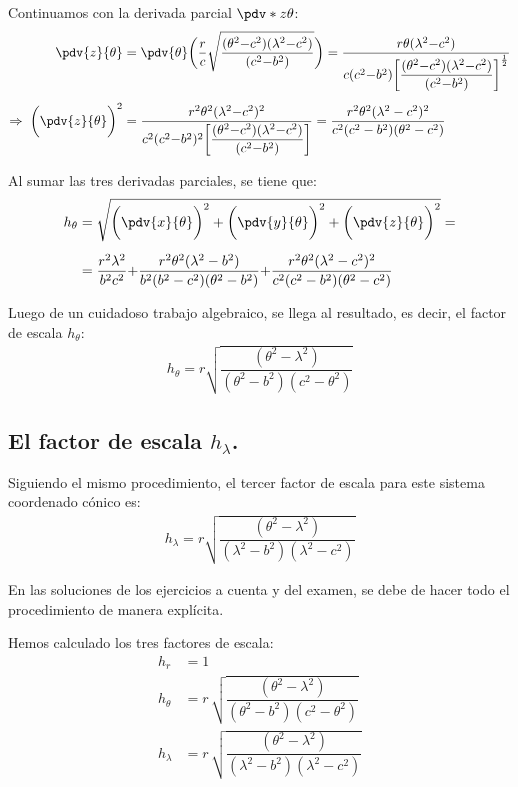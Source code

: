 Continuamos con la derivada parcial $\pdv*{z}{\theta}$:
\begin{align*}
\pdv{z}{\theta} &=  \pdv{\theta} \bigg( \dfrac{r}{c} \sqrt{\dfrac{(\theta^{2} {-} c^{2})(\lambda^{2} {-} c^{2})}{(c^{2} {-} b^{2})}} \bigg) = \dfrac{r \theta (\lambda^{2} {-} c^{2})}{c (c^{2} {-} b^{2}) \bigg[ \dfrac{(\theta^{2} {-} c^{2})(\lambda^{2} {-} c^{2})}{(c^{2} {-} b^{2})} \bigg]^{\frac{1}{2}}} \\[0.5em]
\Rightarrow \hspace{0.1cm} \bigg( \pdv{z}{\theta} \bigg)^{2} &= \dfrac{r^{2} \theta^{2} (\lambda^{2} {-} c^{2})^{2}}{c^{2} (c^{2} {-} b^{2})^{2} \bigg[ \dfrac{(\theta^{2} {-} c^{2})(\lambda^{2} {-} c^{2})}{(c^{2} {-} b^{2})} \bigg]} = \dfrac{r^{2} \theta^{2} (\lambda^{2} - c^{2})^{2}}{c^{2} (c^{2} - b^{2}) (\theta^{2} - c^{2})}
\end{align*}

Al sumar las tres derivadas parciales, se tiene que:
\begin{align*}
h_{\theta} &= \sqrt{\bigg( \pdv{x}{\theta} \bigg)^{2} + \bigg( \pdv{y}{\theta} \bigg)^{2} + \bigg( \pdv{z}{\theta} \bigg)^{2}} = \\[0.5em] 
&= \dfrac{r^{2} \lambda^{2}}{b^{2} c^{2}} {+} \dfrac{r^{2} \theta^{2} (\lambda^{2} - b^{2})}{b^{2} (b^{2} - c^{2}) (\theta^{2} - b^{2})} {+} \dfrac{r^{2} \theta^{2} (\lambda^{2} - c^{2})^{2}}{c^{2} (c^{2} - b^{2}) (\theta^{2} - c^{2})}
\end{align*}

Luego de un cuidadoso trabajo algebraico, se llega al resultado, es decir, el factor de escala $h_{\theta}$:
\begin{align*}
h_{\theta} = r \sqrt{\dfrac{(\theta^{2} - \lambda^{2})}{(\theta^{2} - b^{2})(c^{2} - \theta^{2})}}
\end{align*}

\subsection*{El factor de escala \texorpdfstring{$h_{\lambda}$}{hl}.}

Siguiendo el mismo procedimiento, el tercer factor de escala para este sistema coordenado cónico es:
\begin{align*}
h_{\lambda} = r \sqrt{\dfrac{(\theta^{2} - \lambda^{2})}{(\lambda^{2} - b^{2})(\lambda^{2} - c^{2})}}
\end{align*}

En las soluciones de los ejercicios a cuenta y del examen, se debe de hacer todo el procedimiento de manera explícita.
\par
Hemos calculado los tres factores de escala:
\begin{align*}
h_{r} &= 1 \\[0.5em]
h_{\theta} &=  r \, \sqrt{\dfrac{(\theta^{2} - \lambda^{2})}{(\theta^{2} - b^{2})(c^{2} - \theta^{2})}} \\[0.5em]
h_{\lambda} &= r \, \sqrt{\dfrac{(\theta^{2} - \lambda^{2})}{(\lambda^{2} - b^{2})(\lambda^{2} - c^{2})}}
\end{align*}


